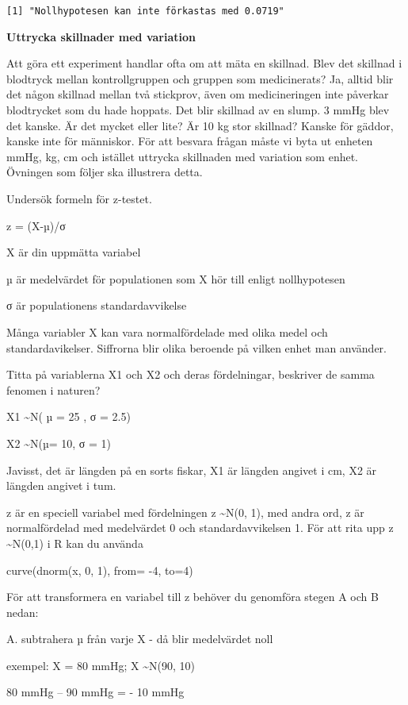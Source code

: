 \documentclass[
  letterpaper,
  DIV=11,
  numbers=noendperiod]{scrartcl}
\begin{document}
\begin{verbatim}
[1] "Nollhypotesen kan inte förkastas med 0.0719"
\end{verbatim}

\textbf{Uttrycka skillnader med variation}

Att göra ett experiment handlar ofta om att mäta en skillnad. Blev det
skillnad i blodtryck mellan kontrollgruppen och gruppen som
medicinerats? Ja, alltid blir det någon skillnad mellan två stickprov,
även om medicineringen inte påverkar blodtrycket som du hade hoppats.
Det blir skillnad av en slump. 3 mmHg blev det kanske. Är det mycket
eller lite? Är 10 kg stor skillnad? Kanske för gäddor, kanske inte för
människor. För att besvara frågan måste vi byta ut enheten mmHg, kg, cm
och istället uttrycka skillnaden med variation som enhet. Övningen som
följer ska illustrera detta.

Undersök formeln för z-testet.

z = (X-µ)/σ

X är din uppmätta variabel

µ är medelvärdet för populationen som X hör till enligt nollhypotesen

σ är populationens standardavvikelse

Många variabler X kan vara normalfördelade med olika medel och
standardavikelser. Siffrorna blir olika beroende på vilken enhet man
använder.

Titta på variablerna X1 och X2 och deras fördelningar, beskriver de
samma fenomen i naturen?

X1 \textasciitilde N( µ = 25 , σ = 2.5)

X2 \textasciitilde N(µ= 10, σ = 1)

Javisst, det är längden på en sorts fiskar, X1 är längden angivet i cm,
X2 är längden angivet i tum.

z är en speciell variabel med fördelningen z \textasciitilde N(0, 1),
med andra ord, z är normalfördelad med medelvärdet 0 och
standardavvikelsen 1. För att rita upp z \textasciitilde N(0,1) i R kan
du använda

curve(dnorm(x, 0, 1), from= -4, to=4)

För att transformera en variabel till z behöver du genomföra stegen A
och B nedan:

A. subtrahera µ från varje X - då blir medelvärdet noll

exempel: X = 80 mmHg; X \textasciitilde N(90, 10)

80 mmHg -- 90 mmHg = - 10 mmHg
\end{document}
